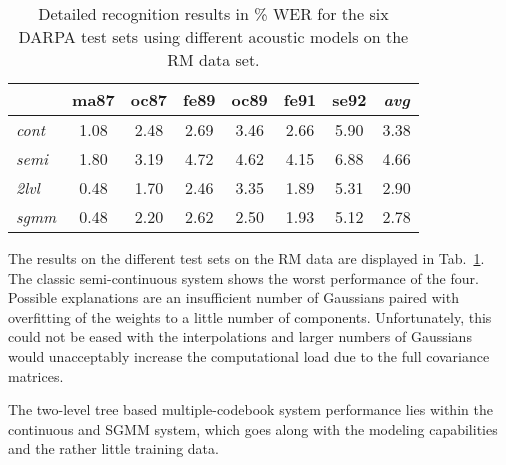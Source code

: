 \documentclass{article}
\begin{document}
\begin{table}%
\begin{center}
\begin{tabular}{|l||c|c|c|c|c|c||c|}
\hline
~               & ma87 & oc87 & fe89 & oc89 & fe91 & se92 & {\em avg}  \\ \hline\hline
{\em cont} &  1.08 &  2.48 &  2.69 &  3.46 &  2.66 &  5.90 & 3.38 \\ \hline
{\em semi} &  1.80 &  3.19 &  4.72 &  4.62 &  4.15 &  6.88 & 4.66 \\ \hline 
{\em 2lvl} &  0.48 &  1.70 &  2.46 &  3.35 &  1.89 &  5.31 & 2.90 \\ \hline
{\em sgmm} &  0.48 &  2.20 &  2.62 &  2.50 &  1.93 &  5.12 & 2.78 \\ \hline
\end{tabular}
\end{center}
\caption{\label{tab:res_rm}
Detailed recognition results in \% WER for the six DARPA test sets using 
different acoustic models on the RM data set.
}
\end{table}

The results on the different test sets on the RM data are displayed in 
Tab.~\ref{tab:res_rm}. The classic semi-continuous system shows the worst 
performance of the four. Possible explanations are an insufficient number
of Gaussians paired with overfitting of the weights to a little number of 
components. Unfortunately, this could not be eased with the interpolations
and larger numbers of Gaussians would unacceptably increase the computational 
load due to the full covariance matrices.

The two-level tree based multiple-codebook system performance lies within the 
continuous and SGMM system, which goes along with the modeling capabilities 
and the rather little training data. 

\end{document}
